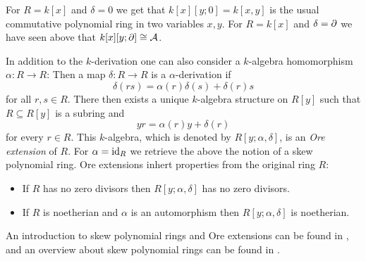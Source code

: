 \begin{remark}
  For $R = k[x]$ and $\delta = 0$ we get that $k[x][y;0] = k[x,y]$ is the usual commutative polynomial ring in two variables $x,y$.
  For $R = k[x]$ and $\delta = \partial$ we have seen above that $k[x][y;\partial] \cong \operatorname{\mathcal{A}}$.
  
  In addition to the $k$-derivation one can also consider a $k$-algebra homomorphism $\alpha \colon R \to R$:
  Then a map $\delta \colon R \to R$ is a $\alpha$-derivation if
  \[
      \delta(rs)
    = \alpha(r) \delta(s) + \delta(r) s
  \]
  for all $r, s \in R$.
  There then exists a unique $k$-algebra structure on $R[y]$ such that $R \subseteq R[y]$ is a subring and
  \[
      y r
    = \alpha(r) y + \delta(r)
  \]
  for every $r \in R$.
  This $k$-algebra, which is denoted by $R[y;\alpha,\delta]$, is an \emph{Ore extension} of $R$.
  For $\alpha = \operatorname{id}_R$ we retrieve the above the notion of a skew polynomial ring.
  Ore extensions inhert properties from the original ring $R$:
  \begin{itemize}
    \item
      If $R$ has no zero divisors then $R[y;\alpha,\delta]$ has no zero divisors.
    \item
      If $R$ is noetherian and $\alpha$ is an automorphism then $R[y;\alpha,\delta]$ is noetherian.
  \end{itemize}
  
  An introduction to skew polynomial rings and Ore extensions can be found in \cite[\S 3]{NoncommutativeNoetherian}, and an overview about skew polynomial rings can be found in \cite[\S 1]{Lam1991First}.
\end{remark}


